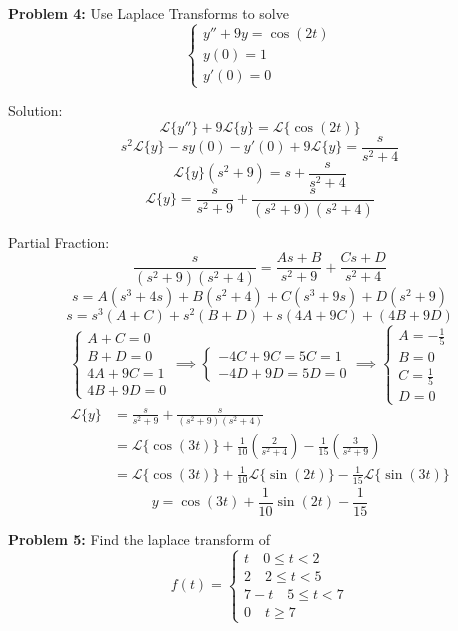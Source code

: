 \documentclass[12pt]{article}
\renewcommand{\L}[1]{\mathcal{L}\{#1\}}
\begin{document}
\pagebreak 

\textbf{Problem 4:} Use Laplace Transforms to solve
\[\begin{cases}
    y'' + 9y = \cos(2t)\\
    y(0) = 1\\
    y'(0) = 0
\end{cases}\]

Solution:
\[\L{y''} + 9\L{y} = \L{\cos (2t)}\]
\[s^2 \L{y} - sy(0) - y'(0) + 9\L{y} = \frac{s}{s^2 + 4}\]
\[\L{y}(s^2 + 9) = s + \frac{s}{s^2 + 4}\]
\[\L{y} = \frac{s}{s^2 + 9} + \frac{s}{(s^2 + 9)(s^2 + 4)}\]

Partial Fraction:
\[\frac{s}{(s^2 + 9)(s^2 + 4)} = \frac{As + B}{s^2 + 9} + \frac{Cs + D}{s^2 + 4}\]
\[s = A(s^3 + 4s) + B(s^2 + 4) + C(s^3 + 9s) + D(s^2 + 9)\]
\[s = s^3 (A + C) + s^2(B + D) + s(4A + 9C) + (4B + 9D)\]
\[\begin{cases}
    A + C = 0\\
    B + D = 0\\
    4A + 9C = 1\\
    4B + 9D = 0
\end{cases} \implies \begin{cases}
    -4C + 9C = 5C = 1\\
    -4D + 9D = 5D = 0
\end{cases} \implies \begin{cases}
    A = -\frac{1}{5}\\
    B = 0\\
    C = \frac{1}{5}\\
    D = 0
\end{cases}\]
\begin{align*}
    \L{y} &= \frac{s}{s^2 + 9} + \frac{s}{(s^2 + 9)(s^2 + 4)}\\
    &= \L{\cos(3t)} + \frac{1}{10} \left(\frac{2}{s^2 + 4}\right) - \frac{1}{15}\left(\frac{3}{s^2 + 9}\right)\\
    &= \L{\cos(3t)} + \frac{1}{10} \L{\sin(2t)} - \frac{1}{15} \L{\sin(3t)}
\end{align*}
\[\boxed{y = \cos(3t) + \frac{1}{10}\sin(2t) - \frac{1}{15}}\]

\pagebreak 

\textbf{Problem 5:} Find the laplace transform of 
\[f(t) = \begin{cases}
    t \quad 0 \leq t < 2\\
    2 \quad 2 \leq t < 5\\
    7 - t \quad 5 \leq t < 7\\
    0 \quad t \geq 7
\end{cases}\]
\end{document}
